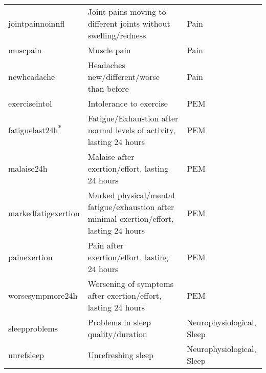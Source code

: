 \begin{tabular}{lll}
jointpainnoinnfl & Joint pains moving to different joints without swelling/redness & Pain \\
muscpain & Muscle pain & Pain \\
newheadache & Headaches new/different/worse than before & Pain \\
exerciseintol & Intolerance to exercise & PEM \\
fatiguelast24h\textsuperscript{${\ast}$} & Fatigue/Exhaustion after normal levels of activity, lasting 24 hours & PEM \\
malaise24h & Malaise after exertion/effort, lasting 24 hours & PEM \\
markedfatigexertion & Marked physical/mental fatigue/exhaustion after minimal exertion/effort, lasting 24 hours & PEM \\
painexertion & Pain after exertion/effort, lasting 24 hours & PEM \\
worsesympmore24h & Worsening of symptoms after exertion/effort, lasting 24 hours & PEM \\
sleepproblems & Problems in sleep quality/duration & Neurophysiological, Sleep \\
unrefsleep & Unrefreshing sleep & Neurophysiological, Sleep \\
\bottomrule
\end{tabular}